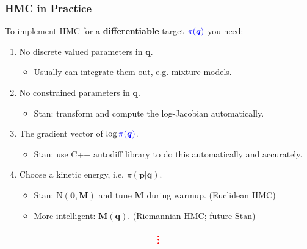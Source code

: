 \documentclass[xcolor=dvipsnames]{beamer}
\begin{document}
\begin{frame}[fragile]
\frametitle{HMC in Practice}
To implement HMC for a \textbf{differentiable} target ${\color{blue}\pi(\bm{q})}$ you need:
\vspace{0.2cm}
\begin{enumerate}
\item No discrete valued parameters in $\bm{q}$.
\begin{itemize}
\item Usually can integrate them out, e.g. mixture models.
\end{itemize}
\vspace{0.2cm}
\item No constrained parameters in $\bm{q}$.
\begin{itemize}
\item Stan: transform and compute the log-Jacobian automatically.
\end{itemize}
\vspace{0.2cm}
\item The gradient vector of $\log {\color{blue}\pi(\bm{q})}$.
\begin{itemize}
\item Stan: use C++ autodiff library to do this automatically and accurately.
\end{itemize}
\vspace{0.2cm}
\item Choose a kinetic energy, i.e. $\pi(\bm{p}|\bm{q})$.
\begin{itemize}
\item Stan: $\mathrm{N}(\bm{0}, \bm{M})$ and tune $\bm{M}$ during warmup. (Euclidean HMC)
\item More intelligent: $\bm{M}(\bm{q})$. (Riemannian HMC; future Stan)
\end{itemize}
\end{enumerate}
\begin{align*}
{\color{red}\Huge{\vdots}}
\end{align*}
\end{frame}
\end{document}
